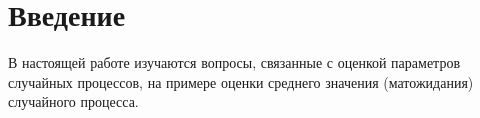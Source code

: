 \documentclass[a4paper,14pt]{extarticle}
\begin{document}


\tableofcontents
\newpage



\section*{Введение}
В настоящей работе изучаются вопросы, связанные с оценкой параметров случайных процессов, на примере оценки среднего значения (матожидания) случайного процесса.
\newpage


\end{document}
